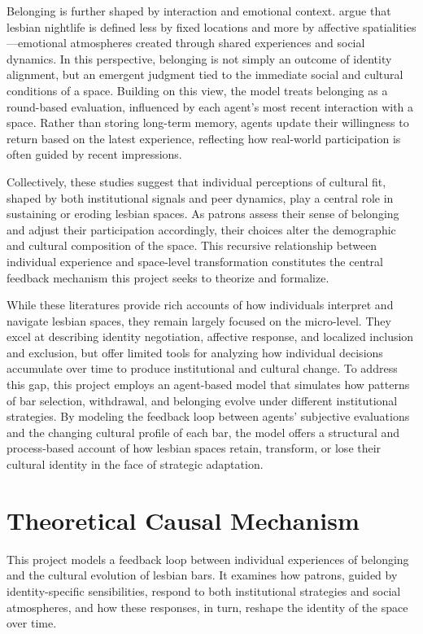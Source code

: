 \documentclass{article}
\begin{document}
Belonging is further shaped by interaction and emotional context. \citet{baxter2024} argue that lesbian nightlife is defined less by fixed locations and more by affective spatialities—emotional atmospheres created through shared experiences and social dynamics. In this perspective, belonging is not simply an outcome of identity alignment, but an emergent judgment tied to the immediate social and cultural conditions of a space. Building on this view, the model treats belonging as a round-based evaluation, influenced by each agent’s most recent interaction with a space. Rather than storing long-term memory, agents update their willingness to return based on the latest experience, reflecting how real-world participation is often guided by recent impressions.

Collectively, these studies suggest that individual perceptions of cultural fit, shaped by both institutional signals and peer dynamics, play a central role in sustaining or eroding lesbian spaces. As patrons assess their sense of belonging and adjust their participation accordingly, their choices alter the demographic and cultural composition of the space. This recursive relationship between individual experience and space-level transformation constitutes the central feedback mechanism this project seeks to theorize and formalize.

While these literatures provide rich accounts of how individuals interpret and navigate lesbian spaces, they remain largely focused on the micro-level. They excel at describing identity negotiation, affective response, and localized inclusion and exclusion, but offer limited tools for analyzing how individual decisions accumulate over time to produce institutional and cultural change. To address this gap, this project employs an agent-based model that simulates how patterns of bar selection, withdrawal, and belonging evolve under different institutional strategies. By modeling the feedback loop between agents’ subjective evaluations and the changing cultural profile of each bar, the model offers a structural and process-based account of how lesbian spaces retain, transform, or lose their cultural identity in the face of strategic adaptation.

\section{Theoretical Causal Mechanism}

This project models a feedback loop between individual experiences of belonging and the cultural evolution of lesbian bars. It examines how patrons, guided by identity-specific sensibilities, respond to both institutional strategies and social atmospheres, and how these responses, in turn, reshape the identity of the space over time.
\end{document}
